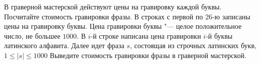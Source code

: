 В граверной мастерской действуют цены на гравировку каждой буквы. Посчитайте стоимость гравировки фразы.
\InputFile
В строках с первой по 26-ю записаны цены на гравировку буквы. Цена гравировки буквы "--- целое положительное число, не большее $1000$. В $i$-й строке написана цена гравировки $i$-й буквы латинского алфавита. Далее идет фраза $s$, состоящая из строчных латинских букв, $1 \le |s| \le 1000$
\OutputFile
Выведите стоимость гравировки фразы в граверной мастерской.
